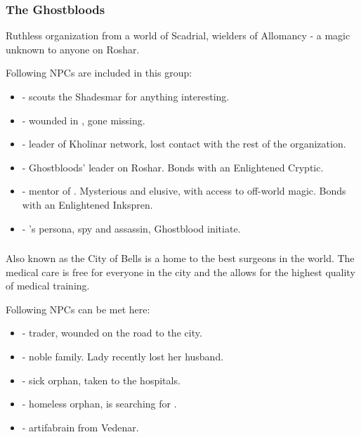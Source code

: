 \subsubsection{The Ghostbloods}

Ruthless organization from a world of Scadrial, wielders of Allomancy - a magic unknown to anyone on Roshar. 

Following NPCs are included in this group:

\begin{itemize}
	\item \npcGhostbloodScout[s]{} - scouts the Shadesmar for anything interesting.
	
	\item \npcGhostbloodWounded[s]{} - wounded in \locationKharbranth{}, gone missing.
	
	\item \npcGhostbloodBoss[s]{} - leader of Kholinar network, lost contact with the rest of the organization.
	
	\item \npcMraize[s]{} - Ghostbloods' leader on Roshar. Bonds with an Enlightened Cryptic.
	
	\item \npcIyatil[s]{} - mentor of \npcMraize{}. Mysterious and elusive, with access to off-world magic. Bonds with an Enlightened Inkspren. 
	
	\item \npcVeil[s]{} - \npcShallan{}'s persona, spy and assassin, Ghostblood initiate.
\end{itemize}



\subsubsection{\locationKharbranth{}}

Also known as the City of Bells is a home to the best surgeons in the world. The medical care is free for everyone in the  city and the \locationPalanaeum{} allows for the highest quality of medical training.

Following NPCs can be met here:

\begin{itemize}
	\item \npcWoundedTrader[s]{} - trader, wounded on the road to the city.
	
	\item \npcKharbranthNoble[s]{} - noble family. Lady \npcKharbranthNoble{} recently lost her husband.
	
	\item \npcOrphanSick[s]{} - sick orphan, taken to the hospitals.
	
	\item \npcOrphanHomeless[s]{} - homeless orphan, is searching for \npcOrphanSick{}.
	
	\item \npcVedenArtifabrian[s]{} - artifabrain from Vedenar.
\end{itemize}


